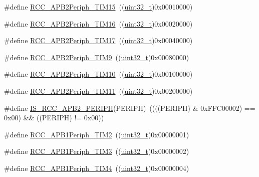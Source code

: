 \begin{DoxyCompactItemize}
\item 
\#define \hyperlink{group___a_p_b2__peripheral_ga774f9082c3331890c06b9fd9deafe549}{R\+C\+C\+\_\+\+A\+P\+B2\+Periph\+\_\+\+T\+I\+M15}~((\hyperlink{_p_e___types_8h_a33594304e786b158f3fb30289278f5af}{uint32\+\_\+t})0x00010000)
\item 
\#define \hyperlink{group___a_p_b2__peripheral_ga739d0a5fe583f07f5b6fa320f2d2e53a}{R\+C\+C\+\_\+\+A\+P\+B2\+Periph\+\_\+\+T\+I\+M16}~((\hyperlink{_p_e___types_8h_a33594304e786b158f3fb30289278f5af}{uint32\+\_\+t})0x00020000)
\item 
\#define \hyperlink{group___a_p_b2__peripheral_ga5a6217b6200d6679dc7bee4522d6038a}{R\+C\+C\+\_\+\+A\+P\+B2\+Periph\+\_\+\+T\+I\+M17}~((\hyperlink{_p_e___types_8h_a33594304e786b158f3fb30289278f5af}{uint32\+\_\+t})0x00040000)
\item 
\#define \hyperlink{group___a_p_b2__peripheral_ga24d0145dc172bc27ed580770cf15e4d9}{R\+C\+C\+\_\+\+A\+P\+B2\+Periph\+\_\+\+T\+I\+M9}~((\hyperlink{_p_e___types_8h_a33594304e786b158f3fb30289278f5af}{uint32\+\_\+t})0x00080000)
\item 
\#define \hyperlink{group___a_p_b2__peripheral_ga75069120ecbe86920b39c2b75c909438}{R\+C\+C\+\_\+\+A\+P\+B2\+Periph\+\_\+\+T\+I\+M10}~((\hyperlink{_p_e___types_8h_a33594304e786b158f3fb30289278f5af}{uint32\+\_\+t})0x00100000)
\item 
\#define \hyperlink{group___a_p_b2__peripheral_gaba591104f4e31b1e8ce98c269035850f}{R\+C\+C\+\_\+\+A\+P\+B2\+Periph\+\_\+\+T\+I\+M11}~((\hyperlink{_p_e___types_8h_a33594304e786b158f3fb30289278f5af}{uint32\+\_\+t})0x00200000)
\item 
\#define \hyperlink{group___a_p_b2__peripheral_ga89a2b95e60e90a51b26b53cc4c0e7b14}{I\+S\+\_\+\+R\+C\+C\+\_\+\+A\+P\+B2\+\_\+\+P\+E\+R\+I\+PH}(P\+E\+R\+I\+PH)~((((P\+E\+R\+I\+PH) \& 0x\+F\+F\+C00002) == 0x00) \&\& ((\+P\+E\+R\+I\+P\+H) != 0x00))
\item 
\#define \hyperlink{group___a_p_b1__peripheral_ga742bab2f04cebe587574b53f7107aeaf}{R\+C\+C\+\_\+\+A\+P\+B1\+Periph\+\_\+\+T\+I\+M2}~((\hyperlink{_p_e___types_8h_a33594304e786b158f3fb30289278f5af}{uint32\+\_\+t})0x00000001)
\item 
\#define \hyperlink{group___a_p_b1__peripheral_gad4454f63a511a256e55aad55c03beb76}{R\+C\+C\+\_\+\+A\+P\+B1\+Periph\+\_\+\+T\+I\+M3}~((\hyperlink{_p_e___types_8h_a33594304e786b158f3fb30289278f5af}{uint32\+\_\+t})0x00000002)
\item 
\#define \hyperlink{group___a_p_b1__peripheral_ga80f9f3720804a97210b723696bd94d83}{R\+C\+C\+\_\+\+A\+P\+B1\+Periph\+\_\+\+T\+I\+M4}~((\hyperlink{_p_e___types_8h_a33594304e786b158f3fb30289278f5af}{uint32\+\_\+t})0x00000004)

\end{DoxyCompactItemize}
